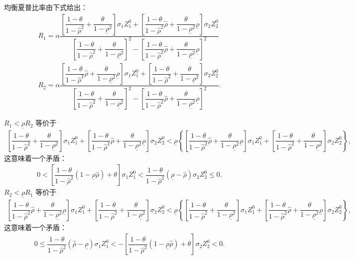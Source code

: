 \documentclass[10.0pt]{article}
\begin{document}
均衡夏普比率由下式给出：
\begin{eqnarray}
& R_1 = \alpha \dfrac{\left[ \dfrac{1 - \theta}{1 - {\hat \rho}^2} + \dfrac{\theta}{1 - \underline{\rho}^2} \right] \sigma_1 Z_1^0 + \left[ \dfrac{1 - \theta}{1 - {\hat \rho}^2} {\hat \rho} + \dfrac{\theta}{1 - \underline{\rho}^2} \underline{\rho} \right] \sigma_2 Z_2^0}{\left[ \dfrac{1 - \theta}{1 - {\hat \rho}^2} + \dfrac{\theta}{1 - \underline{\rho}^2} \right]^2 - \left[ \dfrac{1 - \theta}{1 - {\hat \rho}^2} {\hat \rho} + \dfrac{\theta}{1 - \underline{\rho}^2} \underline{\rho} \right]^2} & \\
& R_2 = \alpha \dfrac{\left[ \dfrac{1 - \theta}{1 - {\hat \rho}^2} {\hat \rho} + \dfrac{\theta}{1 - \underline{\rho}^2} \underline{\rho} \right] \sigma_1 Z_1^0 + \left[ \dfrac{1 - \theta}{1 - {\hat \rho}^2} + \dfrac{\theta}{1 - \underline{\rho}^2} \right] \sigma_2 Z_2^0}{\left[ \dfrac{1 - \theta}{1 - {\hat \rho}^2} + \dfrac{\theta}{1 - \underline{\rho}^2} \right]^2 - \left[ \dfrac{1 - \theta}{1 - {\hat \rho}^2} {\hat \rho} + \dfrac{\theta}{1 - \underline{\rho}^2} \underline{\rho} \right]^2}. &
\end{eqnarray}

$ R_1 < \underline{\rho} R_2 $ 等价于 
{\footnotesize \begin{eqnarray*}
\left[ \dfrac{1 - \theta}{1 - {\hat \rho}^2} + \dfrac{\theta}{1 - \underline{\rho}^2} \right] \sigma_1 Z_1^0 + \left[ \dfrac{1 - \theta}{1 - {\hat \rho}^2} {\hat \rho} + \dfrac{\theta}{1 - \underline{\rho}^2} \underline{\rho} \right] \sigma_2 Z_2^0 < \underline{\rho} \left\{ \left[ \dfrac{1 - \theta}{1 - {\hat \rho}^2} {\hat \rho} + \dfrac{\theta}{1 - \underline{\rho}^2} \underline{\rho} \right] \sigma_1 Z_1^0 + \left[ \dfrac{1 - \theta}{1 - {\hat \rho}^2} + \dfrac{\theta}{1 - \underline{\rho}^2} \right] \sigma_2 Z_2^0 \right\},
\end{eqnarray*}}
这意味着一个矛盾：
\begin{eqnarray*}
0 < \left[ \dfrac{1 - \theta}{1 - {\hat \rho}^2} (1 - \underline{\rho} {\hat \rho}) + \theta \right] \sigma_1 Z_1^0 < \dfrac{1 - \theta}{1 - {\hat \rho}^2} (\underline{\rho} - {\hat \rho}) \sigma_2 Z_2^0 \leqslant 0.
\end{eqnarray*}
$ R_2 < \underline{\rho} R_1 $ 等价于
{\footnotesize \begin{eqnarray*}
\left[ \dfrac{1 - \theta}{1 - {\hat \rho}^2} {\hat \rho} + \dfrac{\theta}{1 - \underline{\rho}^2} \underline{\rho} \right] \sigma_1 Z_1^0 + \left[ \dfrac{1 - \theta}{1 - {\hat \rho}^2} + \dfrac{\theta}{1 - \underline{\rho}^2} \right] \sigma_2 Z_2^0 < \underline{\rho} \left\{ \left[ \dfrac{1 - \theta}{1 - {\hat \rho}^2} + \dfrac{\theta}{1 - \underline{\rho}^2} \right] \sigma_1 Z_1^0 + \left[ \dfrac{1 - \theta}{1 - {\hat \rho}^2} {\hat \rho} + \dfrac{\theta}{1 - \underline{\rho}^2} \underline{\rho} \right] \sigma_2 Z_2^0 \right\},
\end{eqnarray*}}
这意味着一个矛盾：
\begin{eqnarray*}
0 \leqslant \dfrac{1 - \theta}{1 - {\hat \rho}^2} ({\hat \rho} - \underline{\rho}) \sigma_1 Z_1^0 < - \left[ \dfrac{1 - \theta}{1 - {\hat \rho}^2} (1 - \underline{\rho} {\hat \rho}) + \theta \right] \sigma_2 Z_2^0 < 0.
\end{eqnarray*}
\end{document}

